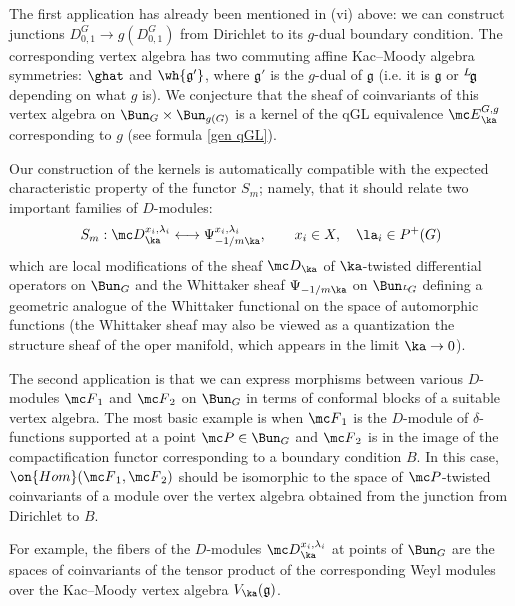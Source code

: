 \documentclass[11pt,reqno]{amsart}
\theoremstyle{plain}
\numberwithin{equation}{section}
\newcommand{\g}{\mathfrak{g}}
\def\neg{\negthinspace}
\def\lg{{}^L\neg\g}
\def\LG{{}^L\neg G}
\theoremstyle{definition}
\begin{document}
\bigskip

The first application has already been mentioned in (vi) above: we can
construct junctions $D^G_{0,1} \to g(D^G_{0,1})$ from Dirichlet to its
$g$-dual boundary condition. The corresponding vertex algebra has two
commuting affine Kac--Moody algebra symmetries: $\ghat$ and $\wh{\g'}$,
where $\g'$ is the $g$-dual of $\g$ (i.e. it is $\g$ or $\lg$
depending on what $g$ is). We conjecture that the sheaf of
coinvariants of this vertex algebra on $\Bun_G \times \Bun_{g(G)}$ is
a kernel of the qGL equivalence ${\mc E}^{G,g}_\ka$ corresponding to
$g$ (see formula \eqref{gen qGL}).

Our construction of the kernels is automatically compatible with the
expected characteristic property of the functor $S_m$; namely, that it
should relate two important families of $D$-modules:
\begin{equation}
S_m: {\mc D}_\ka^{x_i, \lambda_i} \longleftrightarrow \Psi^{x_i,
  \lambda_i}_{-1/m \ka}, \qquad x_i \in X, \quad \la_i \in P^+(G)
\end{equation}
which are local modifications of the sheaf ${\mc D}_\ka$ of
$\ka$-twisted differential operators on $\Bun_G$ and the Whittaker
sheaf $\Psi_{-1/m \ka}$ on $\Bun_{\LG}$ defining a geometric
analogue of the Whittaker functional on the space of automorphic
functions (the Whittaker sheaf may also be viewed as a quantization
the structure sheaf of the oper manifold, which appears in the limit
$\ka \to 0$).

\medskip

The second application is that we can express morphisms between
various $D$-modules ${\mc F}_1$ and ${\mc F}_2$ on $\Bun_G$ in terms
of conformal blocks of a suitable vertex algebra. The most basic
example is when ${\mc F}_1$ is the $D$-module of $\delta$-functions
supported at a point ${\mc P} \in \Bun_G$ and ${\mc F}_2$ is in the
image of the compactification functor corresponding to a boundary
condition $B$. In this case, $\on{Hom}({\mc F}_1,{\mc F}_2)$ should be
isomorphic to the space of ${\mc P}$-twisted coinvariants of a module
over the vertex algebra obtained from the junction from Dirichlet to
$B$.


For example, the fibers of the $D$-modules ${\mc D}_\ka^{x_i,
  \lambda_i}$ at points of $\Bun_G$ are the spaces of coinvariants of
the tensor product of the corresponding Weyl modules over the
Kac--Moody vertex algebra $V_\ka(\mathfrak{g})$.
\end{document}
